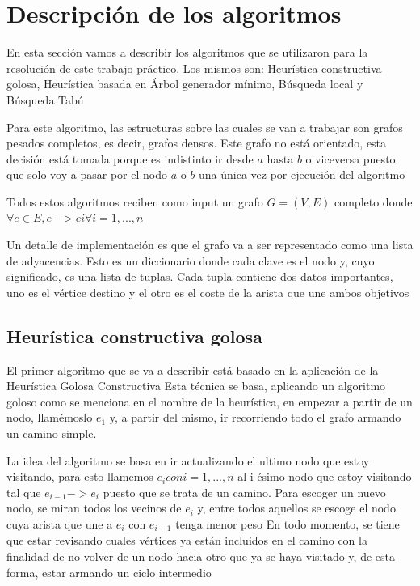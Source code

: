 \documentclass[10pt,a4paper]{article}
\begin{document}
\bigskip

\section{Descripción de los algoritmos}
En esta sección vamos a describir los algoritmos que se utilizaron para la resolución de este trabajo práctico. Los mismos son: Heurística constructiva golosa, Heurística basada en Árbol generador mínimo, Búsqueda local y Búsqueda Tabú

Para este algoritmo, las estructuras sobre las cuales se van a trabajar son grafos pesados completos, es decir, grafos densos. Este grafo no está orientado, esta decisión está tomada porque es indistinto ir desde $a$ hasta $b$ o viceversa puesto que solo voy a pasar por el nodo $a$ o $b$ una única vez por ejecución del algoritmo

Todos estos algoritmos reciben como input un grafo $G = (V, E)$ completo donde $\forall e \in E, e -> ei \forall i={1,...,n}$

Un detalle de implementación es que el grafo va a ser representado como una lista de adyacencias. Esto es un diccionario donde cada clave es el nodo y, cuyo significado, es una lista de tuplas. Cada tupla contiene dos datos importantes, uno es el vértice destino y el otro es el coste de la arista que une ambos objetivos

\subsection{Heurística constructiva golosa}

El primer algoritmo que se va a describir está basado en la aplicación de la Heurística Golosa Constructiva
Esta técnica se basa, aplicando un algoritmo goloso como se menciona en el nombre de la heurística, en empezar a partir de un nodo, llamémoslo $e_1$ y, a partir del mismo, ir recorriendo todo el grafo armando un camino simple.

La idea del algoritmo se basa en ir actualizando el ultimo nodo que estoy visitando, para esto llamemos $e_i con i={1,...,n}$ al i-ésimo nodo que estoy visitando tal que $e_{i-1} -> e_{i}$ puesto que se trata de un camino.
Para escoger un nuevo nodo, se miran todos los vecinos de $e_i$ y, entre todos aquellos se escoge el nodo cuya arista que une a $e_i$ con $e_{i+1}$ tenga menor peso
En todo momento, se tiene que estar revisando cuales vértices ya están incluidos en el camino con la finalidad de no volver de un nodo hacia otro que ya se haya visitado y, de esta forma, estar armando un ciclo intermedio
\end{document}
